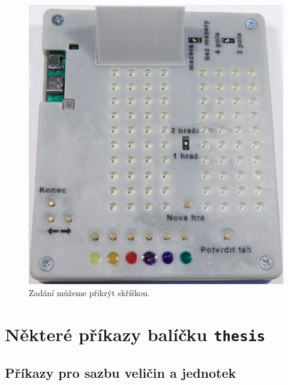   \begin{figure}[!h]
    \begin{center}
      \includegraphics[scale=0.5]{prilohy/Krabicka_se_strechou.jpg}
    \end{center}
    \caption[Zadání můžeme přikrýt skříškou]{Zadání můžeme přikrýt skříškou.}
  \end{figure}
  
  \clearpage
  

  \clearpage
  





\iffalse
\chapter{Některé příkazy balíčku \texttt{thesis}}

\section{Příkazy pro sazbu veličin a jednotek}

